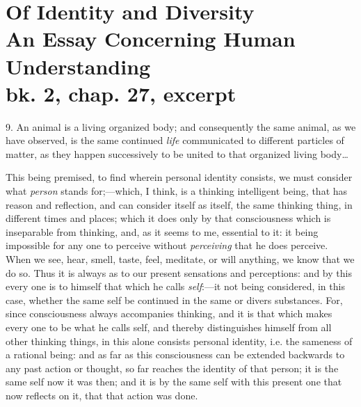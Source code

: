 
\author{John Locke}
\chapter[John Locke -- Of Identity and Diversity, excerpt]{Of Identity
and Diversity\\\smaller An Essay Concerning Human
Understanding\\\smaller bk. 2, chap. 27, excerpt}


9. An animal is a living organized body; and consequently
the same animal, as we have observed, is the same continued
\textit{life} communicated to different particles of matter, as they
happen successively to be united to that organized living body\ldots

This being premised, to find wherein personal
identity consists, we must consider what \textit{person} stands
for;---which, I think, is a thinking intelligent being, that has
reason and reflection, and can consider itself as itself, the same
thinking thing, in different times and places; which it does only by
that consciousness which is inseparable from thinking, and, 
as it seems to me, essential to it: it being impossible for any one
to perceive without \textit{perceiving} that he does perceive. When we
see, hear, smell, taste, feel, meditate, or will anything, we know
that we do so. Thus it is always as to our present sensations and
perceptions: and by this every one is to himself that which he calls
\textit{self}:---it not being considered, in this case, whether the
same self be continued in the same or divers substances. For, since
consciousness always accompanies thinking, and it is that which
makes every one to be what he calls self, and thereby distinguishes
himself from all other thinking things, in this alone consists
personal identity, i.e. the sameness of a rational being: and as far
as this consciousness can be extended backwards to any past action or
thought, so far reaches the identity of that person; it is the same
self now it was then; and it is by the same self with this present one
that now reflects on it, that that action was done.

